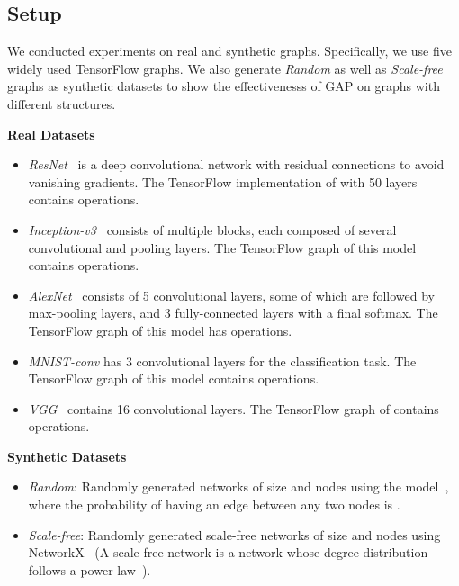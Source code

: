 \documentclass[10pt,twocolumn]{article}
\begin{document}
\subsection{Setup}
\label{sec:setup}
We conducted experiments on real and synthetic graphs. Specifically, we use five widely used TensorFlow graphs. We also generate \textit{Random} as well as \textit{Scale-free} graphs as synthetic datasets to show the effectivenesss of GAP on graphs with different structures.

\noindent\textbf{Real Datasets}
\begin{itemize}[leftmargin=*]
\item{ \textit{ResNet}~\cite{resnet_2016} is a deep convolutional network with residual connections to avoid vanishing gradients. The TensorFlow implementation of  with 50 layers contains  operations.}
\item{\textit{Inception-v3}~\cite{inception_2017} consists of multiple blocks, each composed of several convolutional and pooling layers. The TensorFlow graph of this model contains  operations.}
\end{itemize}
\begin{itemize}[leftmargin=*]
\item{\textit{AlexNet}~\cite{alexnet_2012} consists of 5 convolutional layers, some of which are followed by max-pooling layers, and 3 fully-connected layers with a final softmax. The TensorFlow graph of this model has  operations.}
\item \textit{MNIST-conv} has 3 convolutional layers for the  classification task. The TensorFlow graph of this model contains  operations.
\item{\textit{VGG}~\cite{vgg_2014} contains 16 convolutional layers. The TensorFlow graph of  contains  operations.}
\end{itemize}

\noindent\textbf{Synthetic Datasets} 
\begin{itemize}[leftmargin=*]
\item{ \textit{Random}: Randomly generated networks of size  and  nodes using the  model~\cite{erdos_1960}, where the probability of having an edge between any two nodes is .}
\item{ \textit{Scale-free}: Randomly generated scale-free networks of size  and  nodes using NetworkX~\cite{hagberg2008} (A scale-free network is a network whose degree distribution follows a power law~\cite{Bollobas2003}).}
\end{itemize}
\end{document}

